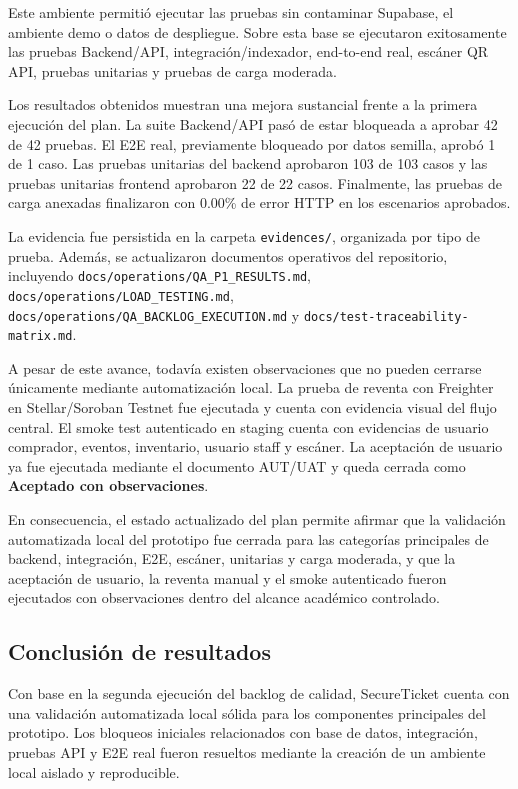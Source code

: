 \documentclass[12pt,letterpaper]{article}
\newcommand{\NombreProyecto}{SecureTicket}
\begin{document}
Este ambiente permitió ejecutar las pruebas sin contaminar Supabase, el ambiente demo o datos de despliegue. Sobre esta base se ejecutaron exitosamente las pruebas Backend/API, integración/indexador, end-to-end real, escáner QR API, pruebas unitarias y pruebas de carga moderada.

Los resultados obtenidos muestran una mejora sustancial frente a la primera ejecución del plan. La suite Backend/API pasó de estar bloqueada a aprobar 42 de 42 pruebas. El E2E real, previamente bloqueado por datos semilla, aprobó 1 de 1 caso. Las pruebas unitarias del backend aprobaron 103 de 103 casos y las pruebas unitarias frontend aprobaron 22 de 22 casos. Finalmente, las pruebas de carga anexadas finalizaron con 0.00\% de error HTTP en los escenarios aprobados.

La evidencia fue persistida en la carpeta \texttt{evidences/}, organizada por tipo de prueba. Además, se actualizaron documentos operativos del repositorio, incluyendo \texttt{docs/operations/QA\_P1\_RESULTS.md}, \texttt{docs/operations/LOAD\_TESTING.md}, \texttt{docs/operations/QA\_BACKLOG\_EXECUTION.md} y \texttt{docs/test-traceability-matrix.md}.

A pesar de este avance, todavía existen observaciones que no pueden cerrarse únicamente mediante automatización local. La prueba de reventa con Freighter en Stellar/Soroban Testnet fue ejecutada y cuenta con evidencia visual del flujo central. El smoke test autenticado en staging cuenta con evidencias de usuario comprador, eventos, inventario, usuario staff y escáner. La aceptación de usuario ya fue ejecutada mediante el documento AUT/UAT y queda cerrada como \textbf{Aceptado con observaciones}.

En consecuencia, el estado actualizado del plan permite afirmar que la validación automatizada local del prototipo fue cerrada para las categorías principales de backend, integración, E2E, escáner, unitarias y carga moderada, y que la aceptación de usuario, la reventa manual y el smoke autenticado fueron ejecutados con observaciones dentro del alcance académico controlado.

\subsection{Conclusión de resultados}

Con base en la segunda ejecución del backlog de calidad, \NombreProyecto{} cuenta con una validación automatizada local sólida para los componentes principales del prototipo. Los bloqueos iniciales relacionados con base de datos, integración, pruebas API y E2E real fueron resueltos mediante la creación de un ambiente local aislado y reproducible.
\end{document}
